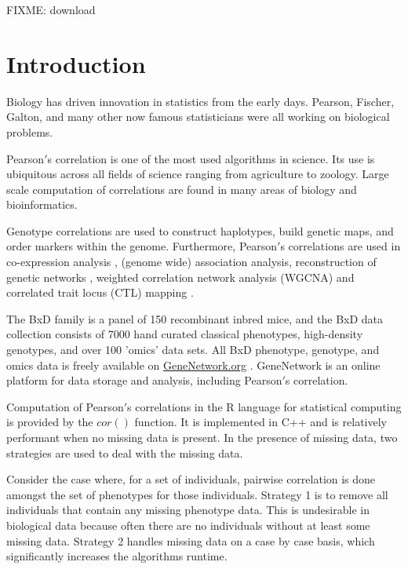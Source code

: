 \documentclass{bioinfo}
\begin{document}
FIXME: download

\maketitle

\section{Introduction}
Biology has driven innovation in statistics from the early days. Pearson, Fischer,
Galton, and many other now famous statisticians were all working on biological
problems.

\enlargethispage{12pt}

Pearson$'$s correlation is one of the most used algorithms in science. Its use is
ubiquitous across all fields of science ranging from agriculture to zoology. Large
scale computation of correlations are found in many areas of biology and
bioinformatics.

Genotype correlations are used to construct haplotypes, build genetic maps, and
order markers within the genome. Furthermore, Pearson$'$s correlations are used in
co-expression analysis \citep{Tesson:2010}, (genome wide) association analysis,
reconstruction of genetic networks \citep{Fukushima:2013}, weighted correlation
network analysis (WGCNA) \citep{Horvath:2008} and correlated trait locus (CTL)
mapping \citep{Arends2016a}.

The BxD family is a panel of 150 recombinant inbred mice, and the BxD data collection
consists of 7000 hand curated classical phenotypes, high-density genotypes, and over
100 'omics' data sets. All BxD phenotype, genotype, and omics data is freely available on
\href{https://genenetwork.org/}{GeneNetwork.org} \citep{Sloan2016}. GeneNetwork is an
online platform for data storage and analysis, including Pearson$'$s correlation.

Computation of Pearson$'$s correlations in the R language for statistical computing
\citep{R:2005} is provided by the $cor()$ function. It is implemented in C++ and is
relatively performant when no missing data is present. In the presence of missing
data, two strategies are used to deal with the missing data.

Consider the case where, for a set of individuals, pairwise correlation is done
amongst the set of phenotypes for those individuals. Strategy 1 is to remove
all individuals that contain any missing phenotype data. This is undesirable in
biological data because often there are no individuals without at least some
missing data. Strategy 2 handles missing data on a case by case basis,
which significantly increases the algorithms runtime.
\end{document}
